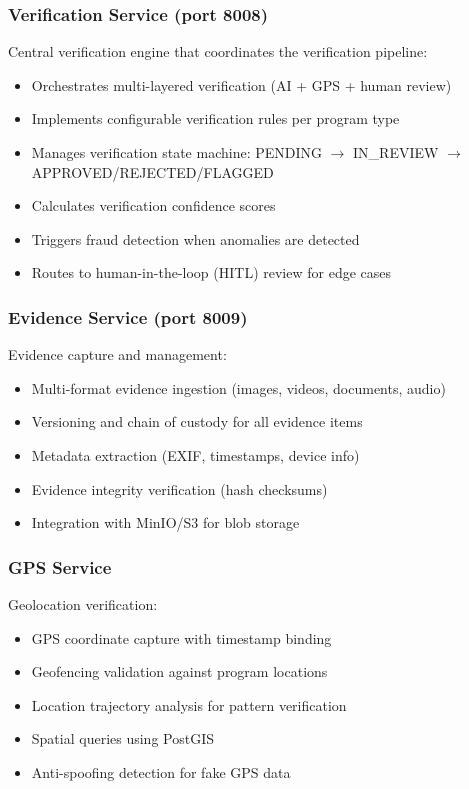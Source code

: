 \subsubsection{Verification Service (port 8008)}

Central verification engine that coordinates the verification pipeline:
\begin{itemize}
  \item Orchestrates multi-layered verification (AI + GPS + human review)
  \item Implements configurable verification rules per program type
  \item Manages verification state machine: PENDING $\rightarrow$ IN\_REVIEW $\rightarrow$ APPROVED/REJECTED/FLAGGED
  \item Calculates verification confidence scores
  \item Triggers fraud detection when anomalies are detected
  \item Routes to human-in-the-loop (HITL) review for edge cases
\end{itemize}

\subsubsection{Evidence Service (port 8009)}

Evidence capture and management:
\begin{itemize}
  \item Multi-format evidence ingestion (images, videos, documents, audio)
  \item Versioning and chain of custody for all evidence items
  \item Metadata extraction (EXIF, timestamps, device info)
  \item Evidence integrity verification (hash checksums)
  \item Integration with MinIO/S3 for blob storage
\end{itemize}

\subsubsection{GPS Service}

Geolocation verification:
\begin{itemize}
  \item GPS coordinate capture with timestamp binding
  \item Geofencing validation against program locations
  \item Location trajectory analysis for pattern verification
  \item Spatial queries using PostGIS
  \item Anti-spoofing detection for fake GPS data
\end{itemize}


